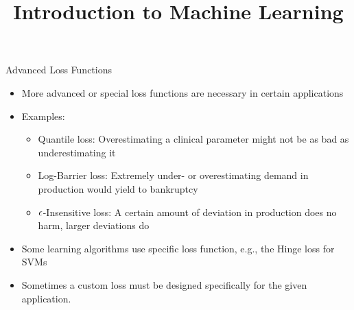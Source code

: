 




\newcommand{\titlefigure}{figure_man/optimization_steps.jpeg}
\newcommand{\learninggoals}{
  \item Know the Log-Barrier loss
  \item Know the $\eps$-Insensitive loss
  \item Know the Quantile loss
}

\title{Introduction to Machine Learning}
\date{}





\begin{vbframe}{Advanced Loss Functions}
\begin{itemize}
\item More advanced or special loss functions are necessary in certain applications
\item Examples:
\begin{itemize}
\item Quantile loss: Overestimating a clinical parameter might not be as bad as underestimating it
\item Log-Barrier loss: Extremely under- or overestimating demand in production would yield to bankruptcy
\item $\epsilon$-Insensitive loss: A certain amount of deviation in production does no harm, larger deviations do
\end{itemize}
\item Some learning algorithms use specific loss function, e.g., the Hinge loss for SVMs
\item Sometimes a custom loss must be designed specifically for the given application.
\end{itemize}
\end{vbframe}


